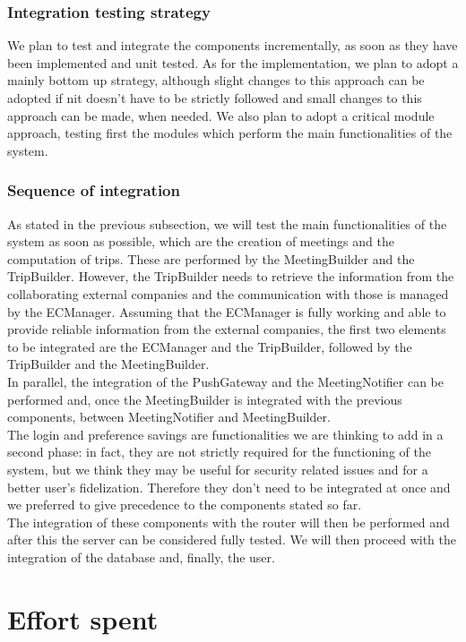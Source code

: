 \documentclass[a4paper,leqno]{article}
\begin{document}
\subsubsection{Integration testing strategy}
We plan to test and integrate the components incrementally, as soon as they have been implemented and unit tested. As for the implementation, we plan to adopt a mainly bottom up strategy, although slight changes to this approach can be adopted if nit doesn't have to be strictly followed and small changes to this approach can be made, when needed.
We also plan to adopt a critical module approach, testing first the modules which perform the main functionalities of the system.

\subsubsection{Sequence of integration}
As stated in the previous subsection, we will test the main functionalities of the system as soon as possible, which are the creation of meetings and the computation of trips. These are performed by the MeetingBuilder and the TripBuilder. However, the TripBuilder needs to retrieve the information from the collaborating external companies and the communication with those is managed by the ECManager. Assuming that the ECManager is fully working and able to provide reliable information from the external companies, the first two elements to be integrated are the ECManager and the TripBuilder, followed by the TripBuilder and the MeetingBuilder.\\
In parallel, the integration of the PushGateway and the MeetingNotifier can be performed and, once the MeetingBuilder is integrated with the previous components, between MeetingNotifier and MeetingBuilder.\\
The login and preference savings are functionalities we are thinking to add in a second phase: in fact, they are not strictly required for the functioning of the system, but we think they may be useful for security related issues and for a better user's fidelization. Therefore they don't need to be integrated at once and we preferred to give precedence to the components stated so far.\\
The integration of these components with the router will then be performed and after this the server can be considered fully tested. We will then proceed with the integration of the database and, finally, the user.

\newpage
\section{Effort spent}
\end{document}
